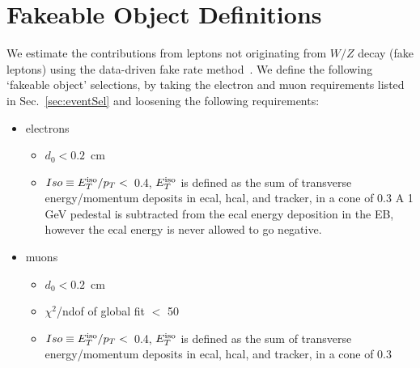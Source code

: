 \section{Fakeable Object Definitions}
\label{sec:appendix_fo}

We estimate the contributions from leptons not originating from $W/Z$ decay (fake leptons)
using the data-driven fake rate method~\cite{ref:top}. 
We define the following `fakeable object'
selections, by taking the electron and muon requirements listed in Sec.~\ref{sec:eventSel}
and loosening the following requirements:

\begin{itemize}
\item{electrons}
   \begin{itemize}
   \item $d_0 < 0.2$~cm
   \item $Iso \equiv E_T^{\rm iso}/p_T < $~0.4, $E_T^{\rm iso}$ is defined as the sum of 
transverse energy/momentum deposits in ecal, hcal, and tracker, in a cone of 0.3
A 1 GeV pedestal is subtracted from the ecal energy  deposition in the EB, however 
the ecal energy is never allowed to go negative.
   \end{itemize}
\item{muons}
   \begin{itemize}
   \item $d_0 < 0.2$~cm
   \item $\chi^2$/ndof of global fit $<$ 50
   \item $Iso \equiv E_T^{\rm iso}/p_T < $~0.4, $E_T^{\rm iso}$ is defined as the sum of 
transverse energy/momentum deposits in ecal, hcal, and tracker, in a cone of 0.3
   \end{itemize}
\end{itemize}

